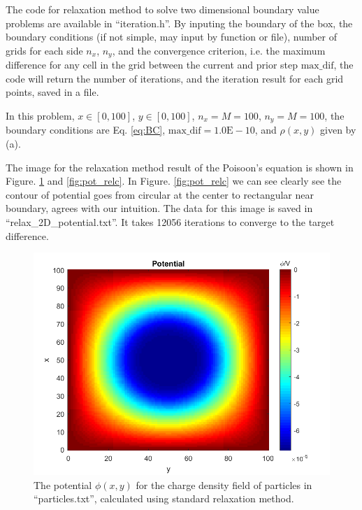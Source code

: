 \documentclass[12pt, graphicx]{article}
\begin{document}
The code for relaxation method to solve two dimensional boundary value problems are available in \textquotedblleft iteration.h\textquotedblright. By inputing the boundary of the box, the boundary conditions (if not simple, may input by function or file), number of grids for each side $n_x$, $n_y$, and the convergence criterion, i.e. the maximum difference for any cell in the grid between the current and prior step $\mathrm{max\_dif}$, the code will return the number of iterations, and the iteration result for each grid points, saved in a file. \par
In this problem, $x\in[0,100]$, $y\in[0,100]$, $n_x=M=100$, $n_y=M=100$, the boundary conditions are Eq.  \ref{eq:BC}, $\mathrm{max\_dif=1.0E-10}$, and $\rho(x,y)$ given by (a). \par
The image for the relaxation method result of the Poisoon's equation is shown in Figure. \ref{fig:pot_rel} and \ref{fig:pot_relc}. In Figure. \ref{fig:pot_relc} we can see clearly see the contour of potential goes from circular at the center to rectangular near boundary, agrees with our intuition. The data for this image is saved in \textquotedblleft relax\_2D\_potential.txt\textquotedblright. It takes 12056 iterations to converge to the target difference.

\begin{figure}[ht]
\centering
\includegraphics[width = 140mm]{potential.png}
\caption{The potential $\phi(x,y)$ for the charge density field of particles in \textquotedblleft particles.txt\textquotedblright, calculated using standard relaxation method.}
\label{fig:pot_rel}
\end{figure}
\end{document}
